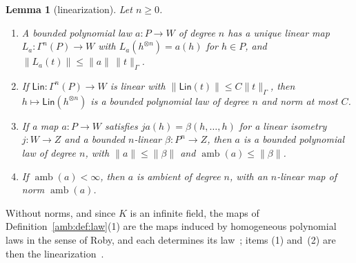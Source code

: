 \documentclass[11pt]{amsart}
\newtheorem{lemma}[theorem]{Lemma}
\theoremstyle{definition}
\theoremstyle{remark}
\numberwithin{equation}{section}
\newcommand{\norm}[1]{\lVert #1\rVert}
\theoremstyle{plain}
\theoremstyle{definition}
\theoremstyle{plain}
\begin{document}
\begin{lemma}[linearization]\label{amb:lem:linearization}
Let $n\ge0$.
\begin{enumerate}
\item A bounded polynomial law $a\colon P\to W$ of degree $n$ has a unique linear map $L_a\colon\Gamma^n(P)\to W$ with $L_a(h^{\otimes n})=a(h)$ for $h\in P$, and $\norm{L_a(t)}\le\norm a\,\norm t_\Gamma$.
\item If $\mathsf{Lin}\colon\Gamma^n(P)\to W$ is linear with $\norm{\mathsf{Lin}(t)}\le C\norm t_\Gamma$, then $h\mapsto\mathsf{Lin}(h^{\otimes n})$ is a bounded polynomial law of degree $n$ and norm at most $C$.
\item If a map $a\colon P\to W$ satisfies $ja(h)=\beta(h,\dots,h)$ for a linear isometry $j\colon W\to Z$ and a bounded $n$\nobreakdash-linear $\beta\colon P^n\to Z$, then $a$ is a bounded polynomial law of degree $n$, with $\norm a\le\norm\beta$ and $\operatorname{amb}(a)\le\norm\beta$.
\item If $\operatorname{amb}(a)<\infty$, then $a$ is ambient of degree $n$, with an $n$\nobreakdash-linear map of norm $\operatorname{amb}(a)$.
\end{enumerate}
\end{lemma}

Without norms, and since $K$ is an infinite field, the maps of Definition~\ref{amb:def:law}(1) are the maps induced by homogeneous polynomial laws in the sense of Roby, and each determines its law~\cite[Th.~I.1, Props.~I.1, I.8, IV.6]{Ro}; items (1) and~(2) are then the linearization~\cite[Th.~IV.1, Prop.~IV.5]{Ro}.
\end{document}
